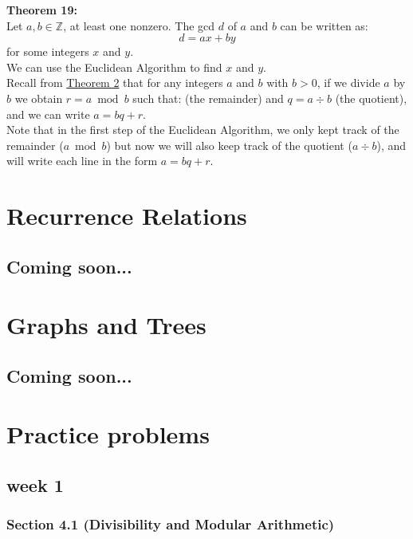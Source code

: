 \documentclass[12pt]{article}
\begin{document}
\noindent\textbf{Theorem 19:}
\label{thm:bezout}
\\Let $a,b \in \mathbb{Z}$, at least one nonzero. 
The gcd $d$ of $a$ and $b$ can be written as:
\[
d = ax + by
\]
for some integers $x$ and $y$.  
\\We can use the Euclidean Algorithm to find $x$ and $y$.  
\\Recall from \hyperref[thm:division]{Theorem 2} that for any integers 
$a$ and $b$ with $b>0$, if we divide $a$ by $b$ we obtain $r=a \bmod b$ such that:
(the remainder) and $q=a \div b$ (the quotient), and we can write $a=bq+r$.
\\Note that in the first step of the Euclidean Algorithm, we only kept track of the 
remainder ($a \bmod b$) but now we will also keep track of the quotient ($a \div b$),
and will write each line in the form $a=bq+r$.

\newpage
\section{Recurrence Relations}
\subsection*{Coming soon...}

\newpage
\section{Graphs and Trees}
\subsection*{Coming soon...}

\newpage
\section{Practice problems}
\subsection*{week 1}


\subsubsection*{Section 4.1 (Divisibility and Modular Arithmetic)}
\end{document}
